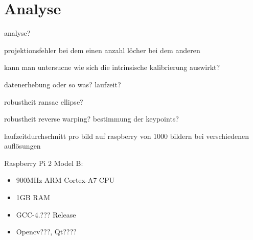 \chapter{Analyse}
analyse?

projektionsfehler bei dem einen
anzahl löcher bei dem anderen

kann man untersucne wie sich die intrinsische kalibrierung auswirkt?

datenerhebung oder so was? laufzeit?

robustheit ransac ellipse?

robustheit reverse warping? bestimmung der keypoints?

laufzeitdurchschnitt pro bild  auf raspberry von 1000 bildern bei verschiedenen auflösungen

Raspberry Pi 2 Model B:
\begin{itemize}
	\item 900MHz ARM Cortex-A7 CPU
	\item 1GB RAM
	\item GCC-4.??? Release
	\item Opencv???, Qt????
\end{itemize}